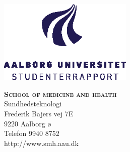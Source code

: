 




\begin{minipage}[t]{0.48\textwidth}
\vspace*{-25pt}			%
\includegraphics[height=4cm]{figures/aau_logo_da.eps}
\end{minipage}
\hfill
\begin{minipage}[t]{0.48\textwidth}
{\small 
\noindent  \textsc{\textbf{School of medicine and health}}\\
Sundhedsteknologi \\
Frederik Bajers vej 7E \\
9220 Aalborg ø\\
Telefon 9940 8752 \\
http://www.smh.aau.dk}
\end{minipage}

\vspace*{0.5cm}

